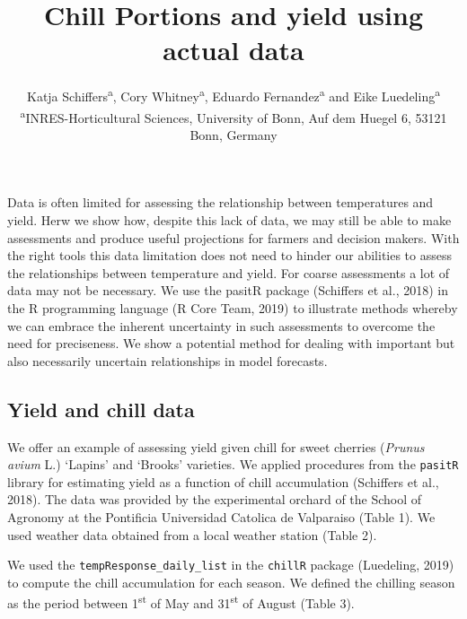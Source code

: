 \documentclass[]{article}
\title{Chill Portions and yield using actual data}
\author{Katja Schiffers\textsuperscript{a}, Cory Whitney\textsuperscript{a},
Eduardo Fernandez\textsuperscript{a} and Eike
Luedeling\textsuperscript{a} \textsuperscript{a}INRES-Horticultural
Sciences, University of Bonn, Auf dem Huegel 6, 53121 Bonn, Germany}
\date{}
\begin{document}
\maketitle

Data is often limited for assessing the relationship between
temperatures and yield. Herw we show how, despite this lack of data, we
may still be able to make assessments and produce useful projections for
farmers and decision makers. With the right tools this data limitation
does not need to hinder our abilities to assess the relationships
between temperature and yield. For coarse assessments a lot of data may
not be necessary. We use the pasitR package (Schiffers et al., 2018) in
the R programming language (R Core Team, 2019) to illustrate methods
whereby we can embrace the inherent uncertainty in such assessments to
overcome the need for preciseness. We show a potential method for
dealing with important but also necessarily uncertain relationships in
model forecasts.

\hypertarget{yield-and-chill-data}{%
\subsection{Yield and chill data}\label{yield-and-chill-data}}

We offer an example of assessing yield given chill for sweet cherries
(\emph{Prunus avium} L.) `Lapins' and `Brooks' varieties. We applied
procedures from the \texttt{pasitR} library for estimating yield as a
function of chill accumulation (Schiffers et al., 2018). The data was
provided by the experimental orchard of the School of Agronomy at the
Pontificia Universidad Catolica de Valparaiso (Table 1). We used weather
data obtained from a local weather station (Table 2).

We used the \texttt{tempResponse\_daily\_list} in the \texttt{chillR}
package (Luedeling, 2019) to compute the chill accumulation for each
season. We defined the chilling season as the period between
1\textsuperscript{st} of May and 31\textsuperscript{st} of August (Table
3).
\end{document}
